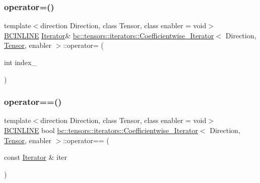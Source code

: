 \subsubsection{\texorpdfstring{operator=()}{operator=()}\hspace{0.1cm}{\footnotesize\ttfamily [2/2]}}
{\footnotesize\ttfamily template$<$direction Direction, class Tensor, class enabler = void$>$ \\
\hyperlink{common_8h_a6699e8b0449da5c0fafb878e59c1d4b1}{B\+C\+I\+N\+L\+I\+NE} \hyperlink{structbc_1_1tensors_1_1iterators_1_1Coefficientwise__Iterator_a313f76f47e60a806035279a36a84f835}{Iterator}\& \hyperlink{structbc_1_1tensors_1_1iterators_1_1Coefficientwise__Iterator}{bc\+::tensors\+::iterators\+::\+Coefficientwise\+\_\+\+Iterator}$<$ Direction, \hyperlink{namespacebc_a659391e47ab612be3ba6c18cf9c89159}{Tensor}, enabler $>$\+::operator= (\begin{DoxyParamCaption}\item[{int}]{index\+\_\+ }\end{DoxyParamCaption})\hspace{0.3cm}{\ttfamily [inline]}}

\mbox{\label{structbc_1_1tensors_1_1iterators_1_1Coefficientwise__Iterator_a5482024588a281ed6f0cd499243a4c87}} 
\subsubsection{\texorpdfstring{operator==()}{operator==()}}
{\footnotesize\ttfamily template$<$direction Direction, class Tensor, class enabler = void$>$ \\
\hyperlink{common_8h_a6699e8b0449da5c0fafb878e59c1d4b1}{B\+C\+I\+N\+L\+I\+NE} bool \hyperlink{structbc_1_1tensors_1_1iterators_1_1Coefficientwise__Iterator}{bc\+::tensors\+::iterators\+::\+Coefficientwise\+\_\+\+Iterator}$<$ Direction, \hyperlink{namespacebc_a659391e47ab612be3ba6c18cf9c89159}{Tensor}, enabler $>$\+::operator== (\begin{DoxyParamCaption}\item[{const \hyperlink{structbc_1_1tensors_1_1iterators_1_1Coefficientwise__Iterator_a313f76f47e60a806035279a36a84f835}{Iterator} \&}]{iter }\end{DoxyParamCaption})\hspace{0.3cm}{\ttfamily [inline]}}

